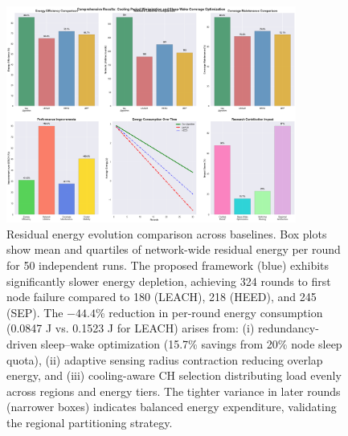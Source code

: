 \begin{figure}[ht]
  \centering
  \includegraphics[width=0.85\textwidth]{figures/figure_03.png}
  \caption{Residual energy evolution comparison across baselines. Box plots show mean and quartiles of network-wide residual energy per round for 50 independent runs. The proposed framework (blue) exhibits significantly slower energy depletion, achieving 324 rounds to first node failure compared to 180 (LEACH), 218 (HEED), and 245 (SEP). The $-44.4$\% reduction in per-round energy consumption (0.0847 J vs. 0.1523 J for LEACH) arises from: (i) redundancy-driven sleep--wake optimization (15.7\% savings from 20\% node sleep quota), (ii) adaptive sensing radius contraction reducing overlap energy, and (iii) cooling-aware CH selection distributing load evenly across regions and energy tiers. The tighter variance in later rounds (narrower boxes) indicates balanced energy expenditure, validating the regional partitioning strategy.}
  \label{fig:energy-evolution}
\end{figure}


